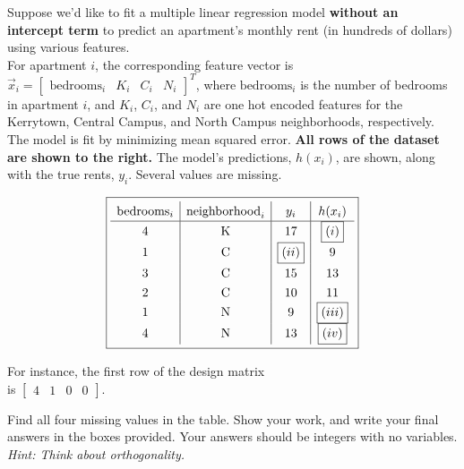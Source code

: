 \documentclass[11pt]{article}
\begin{document}
\begin{prob}
\begin{minipage}[t]{0.60\linewidth}
Suppose we'd like to fit a multiple linear regression model \textbf{without an intercept term} to predict an apartment's monthly rent (in hundreds of dollars) using various features. \\

For apartment $i$, the corresponding feature vector is $\vec x_i =
\begin{bmatrix}
\text{bedrooms}_i &
K_i &
C_i &
N_i
\end{bmatrix}^T$, where $\text{bedrooms}_i$ is the number of bedrooms in apartment $i$, and $K_i$, $C_i$, and $N_i$ are one hot encoded features for the Kerrytown, Central Campus, and North Campus neighborhoods, respectively. \\

The model is fit by minimizing mean squared error. \textbf{All rows of the dataset are shown to the right.} The model's predictions, $h(x_i)$, are shown, along with the true rents, $y_i$. Several values are missing.
\end{minipage}
\hfill
\begin{minipage}[t]{0.53\linewidth}
\vspace{0pt} %
\[
\boxed{\renewcommand{\arraystretch}{1.3}
\begin{array}{c|c|c|c}
\text{bedrooms}_i & \text{neighborhood}_i & y_i & h(x_i) \\
\hline
4 & \text{K} & 17 & \boxed{(i)} \\
1 & \text{C} & \boxed{(ii)} & 9 \\
3 & \text{C} & 15 & 13 \\
2 & \text{C} & 10 & 11 \\
1 & \text{N} & 9 & \boxed{(iii)} \\
4 & \text{N} & 13 & \boxed{(iv)}
\end{array}
\renewcommand{\arraystretch}{1}}
\]

\begin{center}
{\footnotesize For instance, the first row of the design matrix \\ is $\begin{bmatrix} 4 & 1 & 0 & 0 \end{bmatrix}$.}
\end{center}
\end{minipage}

Find all four missing values in the table. Show your work, and write your final answers in the boxes provided. Your answers should be integers with no variables. \textit{Hint: Think about orthogonality.}


\end{prob}
\end{document}
